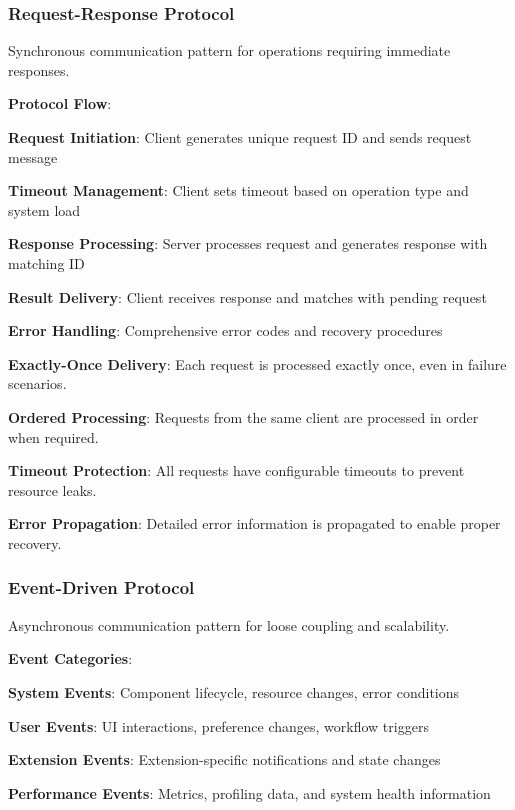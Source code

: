 \subsubsection*{Request-Response Protocol}

Synchronous communication pattern for operations requiring immediate responses.

\textbf{Protocol Flow}:
\begin{expandedlist}
    \item \textbf{Request Initiation}: Client generates unique request ID and sends request message
    \item \textbf{Timeout Management}: Client sets timeout based on operation type and system load
    \item \textbf{Response Processing}: Server processes request and generates response with matching ID
    \item \textbf{Result Delivery}: Client receives response and matches with pending request
    \item \textbf{Error Handling}: Comprehensive error codes and recovery procedures
\end{expandedlist}

\begin{infobox}[title=Request-Response Guarantees]
\textbf{Exactly-Once Delivery}: Each request is processed exactly once, even in failure scenarios.

\textbf{Ordered Processing}: Requests from the same client are processed in order when required.

\textbf{Timeout Protection}: All requests have configurable timeouts to prevent resource leaks.

\textbf{Error Propagation}: Detailed error information is propagated to enable proper recovery.
\end{infobox}

\subsubsection*{Event-Driven Protocol}

Asynchronous communication pattern for loose coupling and scalability.

\textbf{Event Categories}:
\begin{compactlist}
    \item \textbf{System Events}: Component lifecycle, resource changes, error conditions
    \item \textbf{User Events}: UI interactions, preference changes, workflow triggers
    \item \textbf{Extension Events}: Extension-specific notifications and state changes
    \item \textbf{Performance Events}: Metrics, profiling data, and system health information
\end{compactlist}

